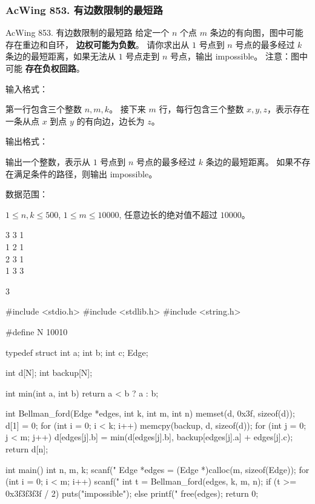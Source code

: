 \subsubsection{AcWing 853. 有边数限制的最短路}
\begin{titledbox}{AcWing 853. 有边数限制的最短路}
    给定一个 $n$ 个点 $m$ 条边的有向图，图中可能存在重边和自环， \textbf{边权可能为负数}。 请你求出从 $1$ 号点到 $n$ 号点的最多经过 $k$ 条边的最短距离，如果无法从 $1$ 号点走到 $n$ 号点，输出 impossible。 注意：图中可能 \textbf{存在负权回路}。

    输入格式：

    第一行包含三个整数 $n,m,k$。 接下来 $m$ 行，每行包含三个整数 $x,y,z$，表示存在一条从点 $x$ 到点 $y$ 的有向边，边长为 $z$。

    输出格式：

    输出一个整数，表示从 $1$ 号点到 $n$ 号点的最多经过 $k$ 条边的最短距离。 如果不存在满足条件的路径，则输出 impossible。

    数据范围：

    $1 \le n,k \le 500$, $1 \le m \le 10000$, 任意边长的绝对值不超过 $10000$。

    \begin{inputblock}
        3 3 1 \\
        1 2 1 \\
        2 3 1 \\
        1 3 3
    \end{inputblock}
    \begin{outputblock}
        3
    \end{outputblock}
\end{titledbox}

\begin{mycpptwocol}
    #include <stdio.h>
    #include <stdlib.h>
    #include <string.h>

    #define N 10010

    typedef struct {
        int a;
        int b;
        int c;
    } Edge;

    int d[N];
    int backup[N];

    int min(int a, int b) {
        return a < b ? a : b;
    }

    int Bellman_ford(Edge *edges, int k, int m, int n) {
        memset(d, 0x3f, sizeof(d));
        d[1] = 0;
        for (int i = 0; i < k; i++) {
            memcpy(backup, d, sizeof(d));
            for (int j = 0; j < m; j++) {
                d[edges[j].b] = min(d[edges[j].b], backup[edges[j].a] + edges[j].c);
            }
        }
        return d[n];
    }

    int main() {
        int n, m, k;
        scanf("%
        Edge *edges = (Edge *)calloc(m, sizeof(Edge));
        for (int i = 0; i < m; i++) {
            scanf("%
        }
        int t = Bellman_ford(edges, k, m, n);
        if (t >= 0x3f3f3f3f / 2) {
            puts("impossible");
        } else {
            printf("%
        }
        free(edges);
        return 0;
    }
\end{mycpptwocol}

